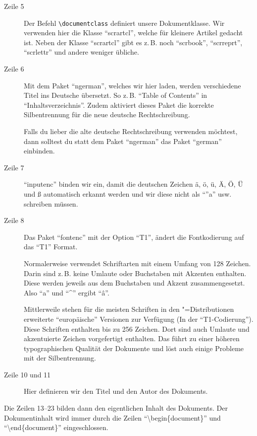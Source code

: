 \begin{description}
\item[Zeile 5] Der Befehl \texttt{\textbackslash documentclass} definiert unsere Dokumentklasse. Wir verwenden hier die Klasse \enquote{scrartcl}, welche für kleinere Artikel gedacht ist. Neben der \KOMAScript{} Klasse \enquote{scrartcl} gibt es z.\,B. noch \enquote{scrbook}, \enquote{scrreprt}, \enquote{scrlettr} und andere weniger übliche.
\item[Zeile 6] Mit dem Paket \enquote{ngerman}, welches wir hier laden, werden verschiedene Titel ins Deutsche übersetzt. So z.\,B. \enquote{Table of Contents} in \enquote{Inhaltsverzeichnis}. Zudem aktiviert dieses Paket die korrekte Silbentrennung für die neue deutsche Rechtschreibung.

Falls du lieber die alte deutsche Rechtschreibung verwenden möchtest, dann solltest du statt dem Paket \enquote{ngerman} das Paket \enquote{german} einbinden.
\item[Zeile 7] \enquote{inputenc} binden wir ein, damit die deutschen Zeichen ä, ö, ü, Ä, Ö, Ü und ß automatisch erkannt werden und wir diese nicht als \enquote{''a} usw. schreiben müssen.
\item[Zeile 8] Das Paket \enquote{fontenc} mit der Option \enquote{T1}, ändert die Fontkodierung auf das \enquote{T1} Format. %

Normalerweise verwendet \DMLLaTeX{} Schriftarten mit einem Umfang von 128 Zeichen. Darin sind z.\,B. keine Umlaute oder Buchstaben mit Akzenten enthalten. Diese werden jeweils aus dem Buchstaben und Akzent zusammengesetzt. Also \enquote{a} und \enquote{\textasciicircum} ergibt \enquote{â}.

Mittlerweile stehen für die meisten Schriften in den \DMLLaTeX"=Distributionen erweiterte \enquote{europäische} Versionen zur Verfügung (In der \enquote{T1-Codierung}). Diese Schriften enthalten bis zu 256 Zeichen. Dort sind auch Umlaute und akzentuierte Zeichen vorgefertigt enthalten. Das führt zu einer höheren typographischen Qualität der Dokumente und löst auch einige Probleme mit der Silbentrennung.
\item[Zeile 10 und 11] Hier definieren wir den Titel und den Autor des Dokuments.
\end{description}

Die Zeilen 13--23 bilden dann den eigentlichen Inhalt des Dokuments. Der Dokumentinhalt wird immer durch die Zeilen \enquote{\textbackslash begin\{document\}} und \enquote{\textbackslash end\{document\}} eingeschlossen.

